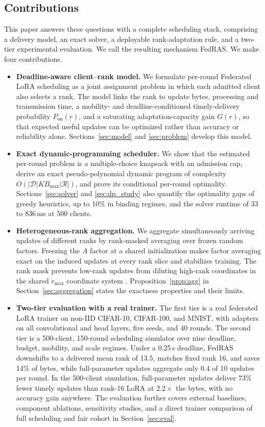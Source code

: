 \documentclass[preprint,12pt]{elsarticle}
\begin{document}
\subsection{Contributions}
This paper answers these questions with a complete scheduling stack, comprising a delivery model, an exact solver, a deployable rank-adaptation rule, and a two-tier experimental evaluation. We call the resulting mechanism FedRAS. We make four contributions.

\begin{itemize}
\item \textbf{Deadline-aware client--rank model.} We formulate per-round Federated LoRA scheduling as a joint assignment problem in which each admitted client also selects a rank. The model links the rank to update bytes, processing and transmission time, a mobility- and deadline-conditioned timely-delivery probability $P_{\mathrm{on}}(r)$, and a saturating adaptation-capacity gain $G(r)$, so that expected useful updates can be optimized rather than accuracy or reliability alone. Sections~\ref{sec:model} and \ref{sec:problem} develop this model.
\item \textbf{Exact dynamic-programming scheduler.} We show that the estimated per-round problem is a multiple-choice knapsack with an admission cap, derive an exact pseudo-polynomial dynamic program of complexity $O(|\mathcal D| K B_{\max}|\mathcal R|)$, and prove its conditional per-round optimality. Sections~\ref{sec:solver} and \ref{sec:dp_study} also quantify the optimality gaps of greedy heuristics, up to 10\% in binding regimes, and the solver runtime of 33 to 836\,ms at 500 clients.
\item \textbf{Heterogeneous-rank aggregation.} We aggregate simultaneously arriving updates of different ranks by rank-masked averaging over frozen random factors. Freezing the $A$ factor at a shared initialization \cite{sun2024ffalora} makes factor averaging exact on the induced updates at every rank slice and stabilizes training. The rank mask prevents low-rank updates from diluting high-rank coordinates in the shared $r_{\max}$ coordinate system \cite{wang2024flora,babakniya2023slora}. Proposition~\ref{prop:agg} in Section~\ref{sec:aggregation} states the exactness properties and their limits.
\item \textbf{Two-tier evaluation with a real trainer.} The first tier is a real federated LoRA trainer on non-IID CIFAR-10, CIFAR-100, and MNIST, with adapters on all convolutional and head layers, five seeds, and 40 rounds. The second tier is a 500-client, 150-round scheduling simulator over nine deadline, budget, mobility, and scale regimes. Under a 0.25\,s deadline, FedRAS downshifts to a delivered mean rank of 13.5, matches fixed rank 16, and saves 14\% of bytes, while full-parameter updates aggregate only 0.4 of 10 updates per round. In the 500-client simulation, full-parameter updates deliver 73\% fewer timely updates than rank-16 LoRA at $2.2\times$ the bytes, with no accuracy gain anywhere. The evaluation further covers external baselines, component ablations, sensitivity studies, and a direct trainer comparison of full scheduling and fair cohort in Section~\ref{sec:eval}.
\end{itemize}
\end{document}
